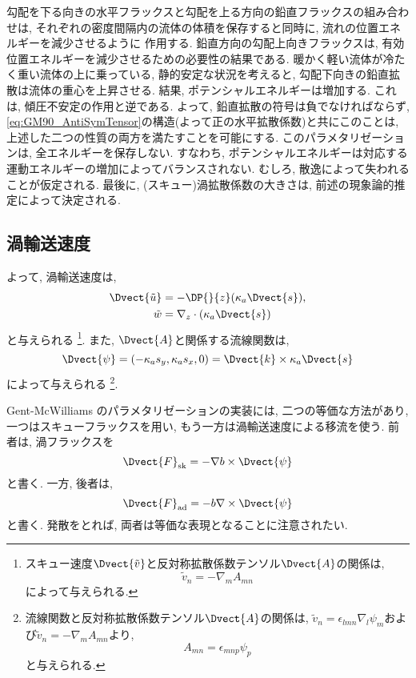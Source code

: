 勾配を下る向きの水平フラックスと勾配を上る方向の鉛直フラックスの組み合わせは, 
それぞれの密度間隔内の流体の体積を保存すると同時に, 流れの位置エネルギーを減少させるように
作用する. 
鉛直方向の勾配上向きフラックスは, 有効位置エネルギーを減少させるための必要性の結果である. 
暖かく軽い流体が冷たく重い流体の上に乗っている, 静的安定な状況を考えると, 
勾配下向きの鉛直拡散は流体の重心を上昇させる. 結果, ポテンシャルエネルギーは増加する. 
これは, 傾圧不安定の作用と逆である. 
よって, 鉛直拡散の符号は負でなければならず, 
\eqref{eq:GM90_AntiSymTensor}の構造(よって正の水平拡散係数)と共にこのことは, 
上述した二つの性質の両方を満たすことを可能にする. 
このパラメタリゼーションは, 全エネルギーを保存しない. 
すなわち, ポテンシャルエネルギーは対応する運動エネルギーの増加によってバランスされない. 
むしろ, 散逸によって失われることが仮定される. 
最後に, (スキュー)渦拡散係数の大きさは, 前述の現象論的推定によって決定される. 

\subsection*{渦輸送速度}
よって, 渦輸送速度は, 
\begin{equation}
 \begin{split}
   \Dvect{\tilde{u}} &= - \DP{}{z} (\kappa_a \Dvect{s}), \\
   \tilde{w} &= \nabla_z \cdot (\kappa_a \Dvect{s})
 \end{split}
\end{equation}
と与えられる%
\footnote{
スキュー速度$\Dvect{\tilde{v}}$と反対称拡散係数テンソル$\Dvect{A}$の関係は, 
\begin{equation*}
  \tilde{v}_n = - \nabla_m A_{mn}
\end{equation*}
によって与えられる. 
}. 
また, $\Dvect{A}$と関係する流線関数は, 
\begin{equation}
  \Dvect{\psi} = (-\kappa_a s_y, \kappa_a s_x, 0) = \Dvect{k} \times \kappa_a \Dvect{s}
\end{equation}
によって与えられる%
\footnote{
流線関数と反対称拡散係数テンソル$\Dvect{A}$の関係は, 
$\tilde{v}_n = \epsilon_{lmn}\nabla_l \psi_m$および$\tilde{v}_n = - \nabla_m A_{mn}$より, 
$$
A_{mn} = \epsilon_{mnp} \psi_p
$$
と与えられる. 
}. 

Gent-McWilliams のパラメタリゼーションの実装には, 二つの等価な方法があり, 
一つはスキューフラックスを用い, もう一方は渦輸送速度による移流を使う. 
前者は, 渦フラックスを
\begin{equation}
  \Dvect{F}_{\rm sk} = - \nabla b \times \Dvect{\psi}
\end{equation}
と書く. 
一方, 後者は, 
\begin{equation}
  \Dvect{F}_{\rm ad} = - b \nabla \times \Dvect{\psi}
\end{equation}
と書く. 
発散をとれば, 両者は等価な表現となることに注意されたい. 

